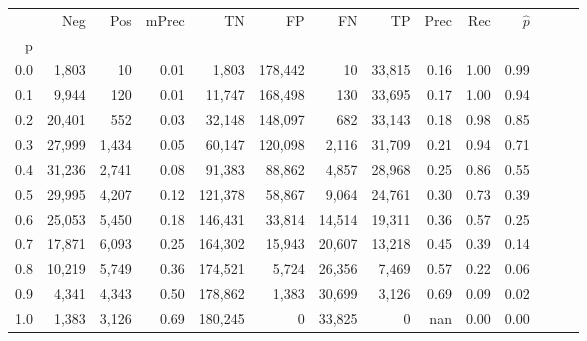 \begin{tabular}{rrrrrrrrrrrrrr}
\toprule
{} &     Neg &    Pos & mPrec &       TN &       FP &      FN &      TP &  Prec &   Rec & $\hat{p}$ \\
p   &         &        &       &          &          &         &         &       &       &           \\
\midrule
0.0 &   1,803 &     10 &  0.01 &    1,803 &  178,442 &      10 &  33,815 &  0.16 &  1.00 &      0.99 \\
0.1 &   9,944 &    120 &  0.01 &   11,747 &  168,498 &     130 &  33,695 &  0.17 &  1.00 &      0.94 \\
0.2 &  20,401 &    552 &  0.03 &   32,148 &  148,097 &     682 &  33,143 &  0.18 &  0.98 &      0.85 \\
0.3 &  27,999 &  1,434 &  0.05 &   60,147 &  120,098 &   2,116 &  31,709 &  0.21 &  0.94 &      0.71 \\
0.4 &  31,236 &  2,741 &  0.08 &   91,383 &   88,862 &   4,857 &  28,968 &  0.25 &  0.86 &      0.55 \\
0.5 &  29,995 &  4,207 &  0.12 &  121,378 &   58,867 &   9,064 &  24,761 &  0.30 &  0.73 &      0.39 \\
0.6 &  25,053 &  5,450 &  0.18 &  146,431 &   33,814 &  14,514 &  19,311 &  0.36 &  0.57 &      0.25 \\
0.7 &  17,871 &  6,093 &  0.25 &  164,302 &   15,943 &  20,607 &  13,218 &  0.45 &  0.39 &      0.14 \\
0.8 &  10,219 &  5,749 &  0.36 &  174,521 &    5,724 &  26,356 &   7,469 &  0.57 &  0.22 &      0.06 \\
0.9 &   4,341 &  4,343 &  0.50 &  178,862 &    1,383 &  30,699 &   3,126 &  0.69 &  0.09 &      0.02 \\
1.0 &   1,383 &  3,126 &  0.69 &  180,245 &        0 &  33,825 &       0 &   nan &  0.00 &      0.00 \\
\bottomrule
\end{tabular}
